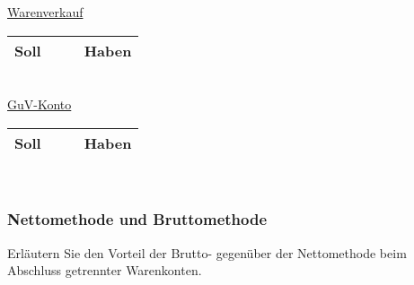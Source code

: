 \documentclass[paper=a4, fontsize=11pt]{scrartcl}
\numberwithin{equation}{section}
\numberwithin{figure}{section}
\numberwithin{table}{section}
\begin{document}
\underline{Warenverkauf}

\begin{tabular}{cc|cc}
\hline
Soll & & & Haben \\
\hline
\end{tabular}
\\

\underline{GuV-Konto}

\begin{tabular}{cc|cc}
\hline
Soll & & & Haben \\
\hline
\end{tabular}
\\


\subsubsection{Nettomethode und Bruttomethode}

Erläutern Sie den Vorteil der Brutto- gegenüber der Nettomethode beim Abschluss getrennter Warenkonten.

\end{document}
